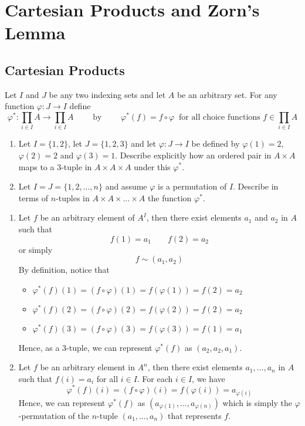 \chapter{Cartesian Products and Zorn's Lemma}

\section{Cartesian Products}

\begin{exercise}
    Let $I$ and $J$ be any two indexing sets and let $A$ be an arbitrary set. For any function $\varphi : J \to I$ define 
    $$\varphi^{\ast} : \prod_{i \in I}A \to \prod_{i \in I}A \qquad \text{ by } \qquad \varphi^{\ast}(f) = f \circ \varphi \ \text{ for all choice functions } f\in \prod_{i \in I}A$$
    \begin{enumerate}[label = \textbf{(\alph*)}]
        \item Let $I = \{1,2\}$, let $J = \{1,2,3\}$ and let $\varphi : J \to I$ be defined by $\varphi(1) = 2$, $\varphi(2) = 2$ and $\varphi(3) = 1$. Describe explicitly how an ordered pair in $A \times A$ maps to a 3-tuple in $A \times A \times A$ under this $\varphi^{\ast}$.
        \item Let $I = J = \{1, 2, \dots, n\}$ and assume $\varphi$ is a permutation of $I$. Describe in terms of $n$-tuples in $A \times A \times \dots \times A$ the function $\varphi^{\ast}$.
    \end{enumerate}
\end{exercise}

\begin{solution}
    \begin{enumerate}[label = \textbf{(\alph*)}]
        \item Let $f$ be an arbitrary element of $A^I$, then there exist elements $a_1$ and $a_2$ in $A$ such that 
        $$f(1) = a_1 \qquad f(2) = a_2$$
        or simply 
        $$f \sim (a_1, a_2)$$
        By definition, notice that 
        \begin{itemize}
            \item $\varphi^{\ast}(f)(1) = (f \circ \varphi)(1) = f(\varphi(1)) = f(2) = a_2$
            \item $\varphi^{\ast}(f)(2) = (f \circ \varphi)(2) = f(\varphi(2)) = f(2) = a_2$
            \item $\varphi^{\ast}(f)(3) = (f \circ \varphi)(3) = f(\varphi(3)) = f(1) = a_1$
        \end{itemize}
        Hence, as a 3-tuple, we can represent $\varphi^{\ast}(f)$ as $(a_2, a_2, a_1)$.
        \item Let $f$ be an arbitrary element in $A^n$, then there exist elements $a_1, \dots , a_n$ in $A$ such that $f(i) = a_i$ for all $i \in I$. For each $i \in I$, we have 
        $$\varphi^{\ast}(f)(i) = (f \circ \varphi)(i) = f(\varphi(i)) = a_{\varphi(i)}$$
        Hence, we can represent $\varphi^{\ast}(f)$ as $(a_{\varphi(1)}, \dots , a_{\varphi(n)})$ which is simply the $\varphi$-permutation of the $n$-tuple $(a_1, \dots , a_n)$ that represents $f$.
    \end{enumerate}
\end{solution}

